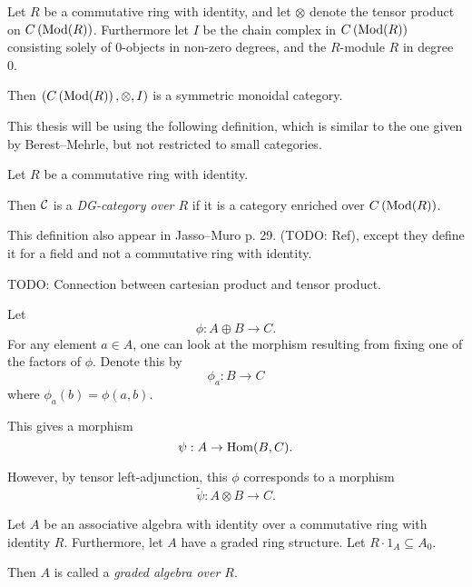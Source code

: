 \begin{fact}[nlab]
    Let \( R \) be a commutative ring with identity, and let \( \otimes \) denote the tensor product on \( C \left( \operatorname{Mod}(R) \right) \). Furthermore let \( I \) be the chain complex in \( C \left( \operatorname{Mod}(R) \right) \) consisting solely of \( 0 \)-objects in non-zero degrees, and the \( R \)-module \( R \) in degree 0. 

    Then \( \left( C \left( \operatorname{Mod}(R) \right), \otimes, I \right) \) is a symmetric monoidal category.
\end{fact}

This thesis will be using the following definition, which is similar to the one given by Berest--Mehrle, but not restricted to small categories.
\begin{definition}
    Let \( R \) be a commutative ring with identity.

    Then \( {\mathcal{C}} \) is a \emph{DG-category over \( R \)} if it is a category enriched over \( C \left( \operatorname{Mod}(R) \right) \).
\end{definition}
This definition also appear in Jasso--Muro p. 29. (TODO: Ref), except they define it for a field and not a commutative ring with identity.

\begin{remark}
    TODO: Connection between cartesian product and tensor product.

    Let
    \[
        \phi: A \oplus B \to C.
    \]
    For any element \( a \in A \), one can look at the morphism resulting from fixing one of the factors of \( \phi \). Denote this by
    \[
        \phi_a: B \to C
    \]
    where \( \phi_a(b) = \phi(a, b) \).
    
    This gives a morphism
    \[
        \psi: A \to \operatorname{Hom}(B, C).
    \]

    However, by tensor left-adjunction, this \( \phi \) corresponds to a morphism
    \[
        \tilde{\psi}: A \otimes B \to C.
    \]
\end{remark}

\begin{definition}
    Let \( A \) be an associative algebra with identity over a commutative ring with identity \( R \). Furthermore, let \( A \) have a graded ring structure. Let \( R \cdot 1_A \subseteq A_0 \).

    Then \( A \) is called a \emph{graded algebra over \( R \)}.
\end{definition}


